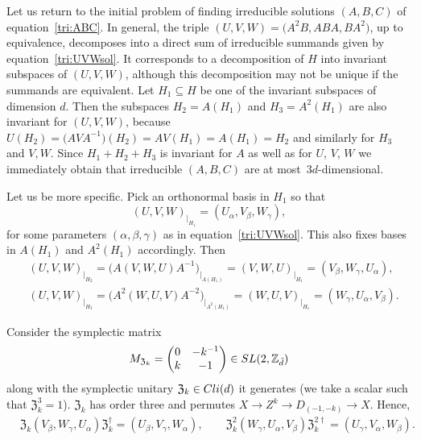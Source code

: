 \documentclass[11pt]{article}
\numberwithin{equation}{section}
\numberwithin{equation}{section}
\newcommand{\ea}[1]{\begin{align}#1\end{align}}
\newcommand{\nn}{\nonumber \\}
\newcommand{\mbb}{\mathbb}
\newcommand{\bmp}{\begin{pmatrix}}
\newcommand{\emp}{\end{pmatrix}}
\begin{document}
Let us return to the initial problem of finding irreducible solutions $(A,B,C)$ of equation~\eqref{tri:ABC}.
In general, the triple $(U,V,W) = \bigl(A^2B, ABA, BA^2\bigr)$, up to equivalence,
decomposes into a direct sum of irreducible summands given by equation~\eqref{tri:UVWsol}.
It corresponds to a decomposition of $H$ into invariant subspaces of $(U,V,W)$,
although this decomposition may not be unique if the summands are equivalent.
Let $H_1 \subseteq H$ be one of the invariant subspaces of dimension $d$.
Then the subspaces $H_2=A(H_1)$ and $H_3=A^2(H_1)$ are also invariant for $(U,V,W)$,
because $U(H_2) = \bigl(AVA^{-1}\bigr)(H_2) = AV(H_1) = A(H_1) = H_2$ and similarly for $H_3$ and $V, W$.
Since $H_1 + H_2 + H_3$ is invariant for $A$ as well as for $U$, $V$, $W$ we immediately obtain
that irreducible $(A,B,C)$ are at most~$3d$-dimensional.

Let us be more specific. Pick an orthonormal basis in $H_1$ so that
\[
 (U,V,W)_{|_{H_1}} = (U_{\alpha},V_{\beta},W_{\gamma}),
\]
for some parameters $(\alpha, \beta, \gamma)$ as in equation~\eqref{tri:UVWsol}.
This also fixes bases in $A(H_1)$ and $A^2(H_1)$ accordingly.
Then
\begin{align*}
 & (U,V,W)_{|_{H_2}} = \bigl(A(V,W,U)A^{-1}\bigr)_{|_{A(H_1)}}
 = (V,W,U)_{|_{H_1}} = (V_{\beta},W_{\gamma},U_{\alpha}), \nn
 & (U,V,W)_{|_{H_3}} = \bigl(A^2(W,U,V)A^{-2}\bigr)_{|_{A^2(H_1)}}
 = (W,U,V)_{|_{H_1}} = (W_{\gamma},U_{\alpha}, V_{\beta}).
\end{align*}

Consider the symplectic matrix
\[
M_{\mathfrak{Z}_k} = \bmp 0 & -k^{-1} \\ k & -1 \emp \in {\rm SL}(2, \mbb{Z}_{\bar{d}} )
\]
along with the symplectic unitary $\mathfrak{Z}_k \in {\rm Cli}(d)$ it generates
(we take a scalar such that $\mathfrak{Z}_k^3=1$).
$\mathfrak{Z}_k$ has order three and permutes $X \rightarrow Z^k \rightarrow D_{(-1,-k)} \rightarrow X$.
Hence,
\begin{align*}
 & \mathfrak{Z}_k(V_{\beta},W_{\gamma},U_{\alpha})\mathfrak{Z}_k^\dag
 = (U_{\beta},V_{\gamma},W_{\alpha}),
 \qquad \mathfrak{Z}_k^2(W_{\gamma},U_{\alpha},V_{\beta})\mathfrak{Z}_k^{2\dag}
 = (U_{\gamma},V_{\alpha},W_{\beta}).
\end{align*}
\end{document}
